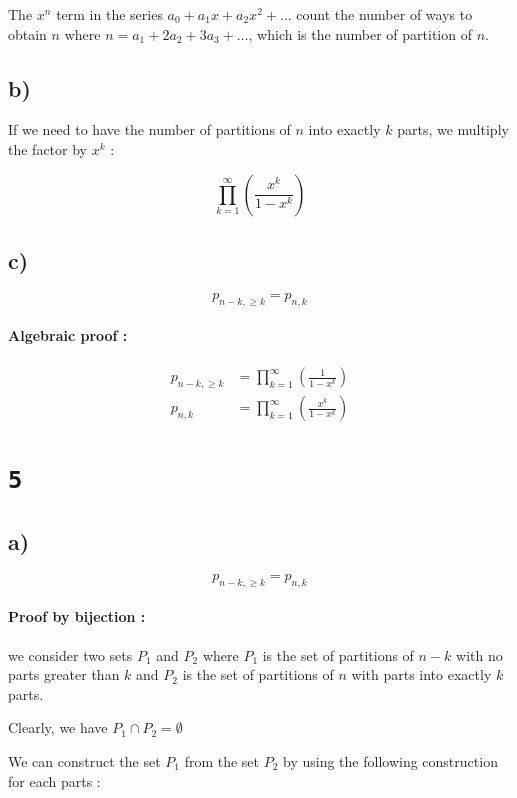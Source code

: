 \documentclass[a4paper,11pt]{report}
\begin{document}
The $x^n$ term in the series $a_0 + a_1x + a_2x^2 + \dots$ count the number of
ways to obtain $n$ where $n = a_1 + 2 a_2 + 3 a_3 + \dots$, which is the number
of partition of $n$.

\subsection*{b)}

If we need to have the number of partitions of $n$ into exactly $k$ parts, we
multiply the factor by $x^k$ :

\[
  \prod_{k=1}^\infty (\frac{x^k}{1 - x^k})
\]

\subsection*{c)}

\[
  p_{n-k,\geq k} = p_{n,k}
\]

\paragraph{Algebraic proof : }

\begin{align*}
  p_{n-k,\geq k} &= \prod_{k=1}^\infty (\frac{1}{1 - x^k}) \\
  p_{n,k} &= \prod_{k=1}^\infty (\frac{x^k}{1 - x^k})
\end{align*}

\section*{\texttt{5}}

\subsection*{a)}

\[
  p_{n-k,\geq k} = p_{n,k}
\]

\paragraph{Proof by bijection : } we consider two sets $P_1$ and $P_2$ where
$P_1$ is the set of partitions of $n-k$ with no parts greater than $k$ and $P_2$
is the set of partitions of $n$ with parts into exactly $k$ parts.

Clearly, we have $P_1 \cap P_2 = \emptyset$

We can construct the set $P_1$ from the set $P_2$ by using the following
construction for each parts :
\end{document}
